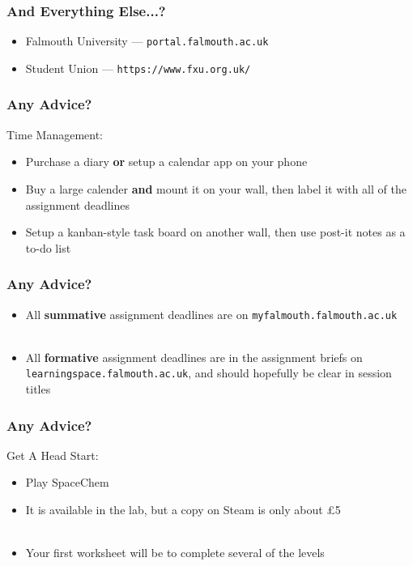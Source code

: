 \begin{frame}
	\frametitle{And Everything Else...?}	
	\begin{itemize}
		\item Falmouth University --- \texttt{portal.falmouth.ac.uk}
		\item Student Union --- \texttt{https://www.fxu.org.uk/}
	\end{itemize}
\end{frame}

\begin{frame}
	\frametitle{Any Advice?}	
	
	Time Management:
	
	\begin{itemize}
		\item Purchase a diary \textbf{or} setup a calendar app on your phone
		\item Buy a large calender \textbf{and} mount it on your wall, then label it with all of the assignment deadlines
		\item Setup a kanban-style task board on another wall, then use post-it notes as a to-do list
	\end{itemize}
\end{frame}

\begin{frame}
	\frametitle{Any Advice?}	
	
	\begin{itemize}
		\item All \textbf{summative} assignment deadlines are on \texttt{myfalmouth.falmouth.ac.uk}
		\\~\\
		\item All \textbf{formative} assignment deadlines are in the assignment briefs on \texttt{learningspace.falmouth.ac.uk}, and should hopefully be clear in session titles
	\end{itemize}
\end{frame}


\begin{frame}
	\frametitle{Any Advice?}	
	
	Get A Head Start:
	
	\begin{itemize}
		\item Play SpaceChem
		\item It is available in the lab, but a copy on Steam is only about £5
		\\~\\
		\item Your first worksheet will be to complete several of the levels
	\end{itemize}
\end{frame}

